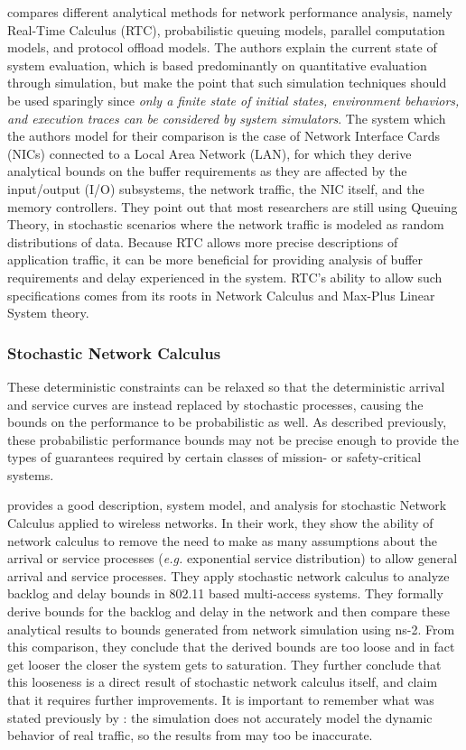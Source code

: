 \cite{RTCcomparison2011} compares different analytical methods for network performance analysis, namely Real-Time Calculus (RTC), probabilistic queuing models, parallel computation models, and protocol offload models.  The authors explain the current state of system evaluation, which is based predominantly on quantitative evaluation through simulation, but make the point that such simulation techniques should be used sparingly since \textit{only a finite state of initial states, environment behaviors, and execution traces can be considered by system simulators}.  The system which the authors model for their comparison is the case of Network Interface Cards (NICs) connected to a Local Area Network (LAN), for which they derive analytical bounds on the buffer requirements as they are affected by the input/output (I/O) subsystems, the network traffic, the NIC itself, and the memory controllers.  They point out that most researchers are still using Queuing Theory, in stochastic scenarios where the network traffic is modeled as random distributions of data.  Because RTC allows more precise descriptions of application traffic, it can be more beneficial for providing analysis of buffer requirements and delay experienced in the system.  RTC's ability to allow such specifications comes from its roots in Network Calculus and Max-Plus Linear System theory. 

\subsubsection{Stochastic Network Calculus}
These deterministic constraints can be relaxed so that the deterministic arrival and service curves are instead replaced by stochastic processes, causing the bounds on the performance to be probabilistic as well\cite{Burchard06amin-plus}.  As described previously, these probabilistic performance bounds may not be precise enough to provide the types of guarantees required by certain classes of mission- or safety-critical systems.

\cite{SNC80211backlogdelay2011} provides a good description, system model, and analysis for stochastic Network Calculus applied to wireless networks.  In their work, they show the ability of network calculus to remove the need to make as many assumptions about the arrival or service processes (\emph{e.g.} exponential service distribution) to allow general arrival and service processes.  They apply stochastic network calculus to analyze backlog and delay bounds in 802.11 based multi-access systems.  They formally derive bounds for the backlog and delay in  the network and then compare these analytical results to bounds generated from network simulation using ns-2.  From this comparison, they conclude that the derived bounds are too loose and in fact get looser the closer the system gets to saturation.  They further conclude that this looseness is a direct result of stochastic network calculus itself, and claim that it requires further improvements.  It is important to remember what was stated previously by \cite{simulator_comparison_2003}: the simulation does not accurately model the dynamic behavior of real traffic, so the results from \cite{SNC80211backlogdelay2011} may too be inaccurate.  

